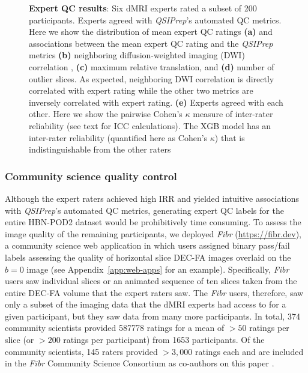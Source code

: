\documentclass[9pt,lineno]{elife}
\begin{document}
\begin{figure}[tbp]
\begin{fullwidth}
\begin{subfigure}{.4\linewidth}
    \end{subfigure}
    \caption{%
        {\bf Expert QC results}:
        Six dMRI experts rated a subset of \num{200} participants.  Experts agreed
        with \emph{QSIPrep}'s automated QC metrics.  Here we show the
        distribution of mean expert QC ratings \textbf{(a)} and associations
        between the mean expert QC rating and the \emph{QSIPrep} metrics
        \textbf{(b)} neighboring diffusion-weighted imaging (DWI) correlation 
        \citep{yeh2019-kb}, \textbf{(c)} maximum relative translation, and
        \textbf{(d)} number of outlier slices. As expected, neighboring DWI correlation is directly
        correlated with expert rating while the other two metrics are inversely
        correlated with expert rating.
        \textbf{(e)} Experts agreed with each other. Here we show the pairwise
        Cohen's $\kappa$ measure of inter-rater reliability (see text for ICC
        calculations). The XGB model has an inter-rater reliability (quantified
        here as Cohen's $\kappa$) that is indistinguishable from the other
        raters
    }
    \label{fig:expert-qc}
\end{fullwidth}
\end{figure}

\subsubsection{Community science quality control}

Although the expert raters achieved high IRR and yielded intuitive associations
with \emph{QSIPrep}'s automated QC metrics, generating expert QC labels for the
entire HBN-POD2 dataset would be prohibitively time consuming. To assess the
image quality of the remaining participants, we deployed \emph{Fibr}
(\url{https://fibr.dev}), a community science web application in which users
assigned binary pass/fail labels assessing the quality of horizontal slice DEC-FA
images overlaid on the $b=0$ image (see Appendix~\ref{app:web-apps} for an example).
Specifically, \emph{Fibr} users saw individual
slices or an animated sequence of ten slices taken from the entire DEC-FA volume
that the expert raters saw. The \emph{Fibr} users, therefore, saw only a subset of
the imaging data that the dMRI experts had access to for a given participant, but they
saw data from many more participants. In total, \num{374} community scientists provided
\num{587778} ratings for a mean of $>50$ ratings per slice (or $>200$ ratings
per participant) from \num{1653} participants. Of the community scientists, \num{145}
raters provided $>3,000$ ratings each and are included in the \emph{Fibr} Community
Science Consortium as co-authors on this paper \citep{Ward-Fear2020-zq}.
\end{document}
